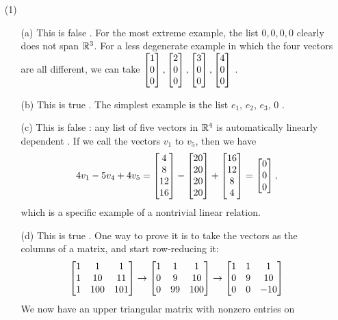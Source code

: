 \documentclass[a4paper]{article}
\begin{document}
\begin{solution}
 \begin{itemize}
  \item[(1)]
   \begin{itemize}
    \item[(a)] This is false \mk.  For the most extreme example, the list
     $0,0,0,0$ clearly does not span ${\mathbb{R}}^3$.  For a less degenerate
     example in which the four vectors are all different, we can take
     $\left[\begin{matrix} 1\\0\\0\end{matrix}\right],\left[\begin{matrix} 2\\0\\0\end{matrix}\right],\left[\begin{matrix} 3\\0\\0\end{matrix}\right],\left[\begin{matrix} 4\\0\\0\end{matrix}\right]$
     \mk.
    \item[(b)] This is true \mk.  The simplest example is the list $e_1$,
     $e_2$, $e_3$, $0$ \mk.
    \item[(c)] This is false \mk: any list of five vectors in ${\mathbb{R}}^4$ is
     automatically linearly dependent \mk.  If we call the vectors $v_1$ to
     $v_5$, then we have
     \[ 4v_1-5v_4+4v_5 = 
         \left[\begin{matrix} 4\\8\\12\\16\end{matrix}\right]  -
         \left[\begin{matrix} 20\\ 20\\ 20\\ 20\end{matrix}\right] +
         \left[\begin{matrix} 16\\ 12 \\ 8 \\ 4 \end{matrix}\right] = 
         \left[\begin{matrix} 0\\ 0\\ 0\end{matrix}\right],
     \]
     which is a specific example of a nontrivial linear relation.
    \item[(d)] This is true \mk.  One way to prove it is to take the vectors
     as the columns of a matrix, and start row-reducing it:
     \[ 
      \left[\begin{matrix} 1 & 1 & 1 \\ 1 & 10 & 11 \\ 1 & 100 & 101 \end{matrix}\right]
      \to
      \left[\begin{matrix} 1 & 1 & 1 \\ 0 & 9 & 10 \\ 0 & 99 & 100 \end{matrix}\right]
      \to
      \left[\begin{matrix} 1 & 1 & 1 \\ 0 & 9 & 10 \\ 0 & 0 & -10 \end{matrix}\right]
     \]
     We now have an upper triangular matrix with nonzero entries on

\end{itemize}
\end{itemize}
\end{solution}
\end{document}
